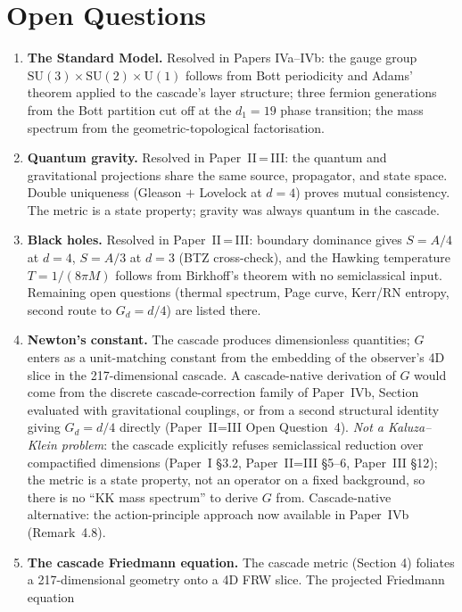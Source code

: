 \documentclass[12pt,a4paper]{article}
\begin{document}
\section{Open Questions}\label{sec:open-questions}

\begin{enumerate}
\item \textbf{The Standard Model.} Resolved in Papers IVa--IVb: the gauge
group $\text{SU}(3) \times \text{SU}(2) \times \text{U}(1)$ follows from
Bott periodicity and Adams' theorem applied to the cascade's layer
structure; three fermion generations from the Bott partition cut off at
the $d_1=19$ phase transition; the mass spectrum from the
geometric-topological factorisation.
\item \textbf{Quantum gravity.} Resolved in Paper~II\,=\,III: the quantum and
gravitational projections share the same source, propagator, and state space.
Double uniqueness (Gleason $+$ Lovelock at $d=4$) proves mutual consistency.
The metric is a state property; gravity was always quantum in the cascade.
\item \textbf{Black holes.} Resolved in Paper~II\,=\,III: boundary dominance gives
$S = A/4$ at $d = 4$, $S = A/3$ at $d = 3$ (BTZ cross-check), and the
Hawking temperature $T = 1/(8\pi M)$ follows from Birkhoff's theorem with no
semiclassical input. Remaining open questions (thermal spectrum, Page curve,
Kerr/RN entropy, second route to $G_d = d/4$) are listed there.
\item \textbf{Newton's constant.} The cascade produces dimensionless quantities;
$G$ enters as a unit-matching constant from the embedding of the observer's
4D slice in the 217-dimensional cascade. A cascade-native derivation of $G$
would come from the discrete cascade-correction family of Paper~IVb, Section~ evaluated with
gravitational couplings, or from a second structural identity giving $G_d = d/4$
directly (Paper~II=III Open Question~4). \emph{Not a Kaluza--Klein problem}:
the cascade explicitly refuses semiclassical reduction over compactified
dimensions (Paper~I \S3.2, Paper~II=III \S5--6, Paper~III \S12); the metric
is a state property, not an operator on a fixed background, so there is no
``KK mass spectrum'' to derive $G$ from. Cascade-native alternative: the
action-principle approach now available in Paper~IVb (Remark~4.8).
\item \textbf{The cascade Friedmann equation.} The cascade metric (Section 4) foliates a
217-dimensional geometry onto a 4D FRW slice. The projected Friedmann equation

\end{enumerate}
\end{document}
